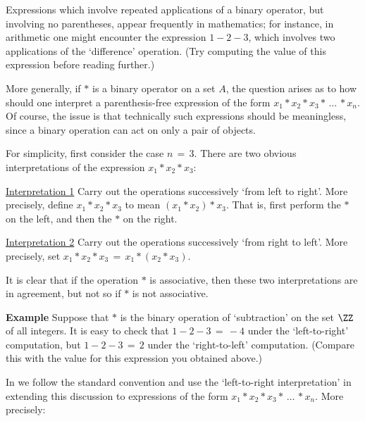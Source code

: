 \VV

        Expressions which involve repeated applications of a binary operator, but involving no parentheses, appear frequently in mathematics;
    for instance, in arithmetic one might encounter the expression $1-2-3$, which involves two applications of the `difference' operation.
    (Try computing the value of this expression before reading further.)

        More generally, if ${\ast}$ is a binary operator on a set $A$, the question arises as to
    how should one interpret a parenthesis-free expression of the form $x_{1}{\ast}x_{2}{\ast}x_{3}{\ast}\,{\ldots}\,{\ast}x_{n}$.
    Of course, the issue is that technically such expressions should be meaningless, since a binary operation can act on only a pair of objects.

        For simplicity, first consider the case $n \,=\, 3$. There are two obvious interpretations of the expression $x_{1}{\ast}x_{2}{\ast}x_{3}$:

\VA

        \underline{Interpretation 1} Carry out the operations successively `from left to right'. 
    More precisely, define $x_{1}{\ast}x_{2}{\ast}x_{3}$ to mean $(x_{1}{\ast}x_{2}){\ast}x_{3}$.
    That is, first perform the ${\ast}$ on the left, and then the ${\ast}$ on the right.

        \underline{Interpretation 2} Carry out the operations successively `from right to left'. 
    More precisely, set $x_{1}{\ast}x_{2}{\ast}x_{3} \,=\, x_{1}{\ast}(x_{2}{\ast}x_{3})$.

\VA

\noindent It is clear that if the operation ${\ast}$ is associative, then these two interpretations are in agreement, but not so if ${\ast}$ is not associative.

\V

        {\bf Example} Suppose that ${\ast}$ is the binary operation of `subtraction' on the set ${\ZZ}$ of all integers.
    It is easy to check that $1-2-3 \,=\, -4$ under the `left-to-right' computation, but $1-2-3 \,=\, 2$ under the `right-to-left' computation.
    (Compare this with the value for this expression you obtained above.)

\V

        In {\ThisText} we follow the standard convention and use the `left-to-right interpretation'
    in extending this discussion to expressions of the form $x_{1}{\ast}x_{2}{\ast}x_{3}{\ast}\,{\ldots}\,{\ast}x_{n}$. More precisely:

